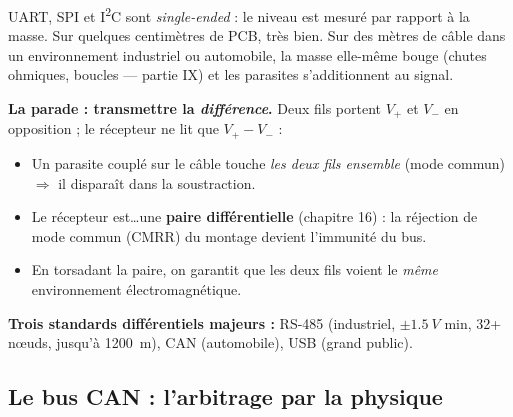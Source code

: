 \documentclass[12pt,a4paper,twoside]{book}
\begin{document}
\begin{formule}
UART, SPI et I\textsuperscript{2}C sont \textit{single-ended} : le niveau est mesuré par rapport à la masse. Sur quelques centimètres de PCB, très bien. Sur des mètres de câble dans un environnement industriel ou automobile, la masse elle-même bouge (chutes ohmiques, boucles --- partie IX) et les parasites s'additionnent au signal.

\textbf{La parade : transmettre la \textit{différence}.} Deux fils portent $V_+$ et $V_-$ en opposition ; le récepteur ne lit que $V_+ - V_-$ :
\begin{itemize}[nosep]
\item Un parasite couplé sur le câble touche \textit{les deux fils ensemble} (mode commun) $\Rightarrow$ il disparaît dans la soustraction.
\item Le récepteur est\ldots une \textbf{paire différentielle} (chapitre 16) : la réjection de mode commun (CMRR) du montage devient l'immunité du bus.
\item En torsadant la paire, on garantit que les deux fils voient le \textit{même} environnement électromagnétique.
\end{itemize}

\textbf{Trois standards différentiels majeurs :} RS-485 (industriel, $\pm\SI{1.5}{V}$ min, 32+ nœuds, jusqu'à \SI{1200}{m}), CAN (automobile), USB (grand public).
\end{formule}

\subsection{Le bus CAN : l'arbitrage par la physique}
\end{document}
